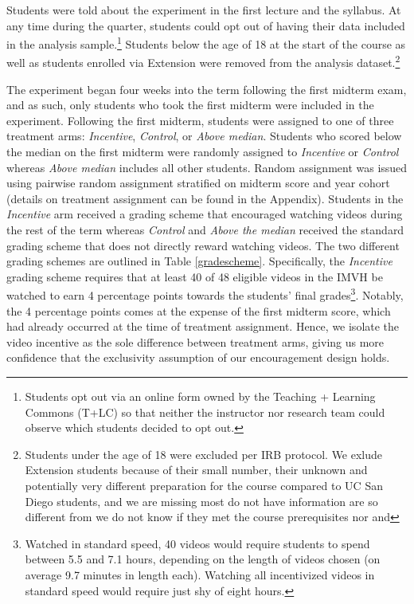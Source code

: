 \documentclass[12pt]{article}
\begin{document}
Students were told about the experiment in the first lecture and the syllabus. At any time during the quarter, students could opt out of having their data included in the analysis sample.\footnote{Students opt out via an online form owned by the Teaching + Learning Commons (T+LC) so that neither the instructor nor research team could observe which students decided to opt out.} Students below the age of 18 at the start of the course as well as students enrolled via Extension were removed from the analysis dataset.\footnote{Students under the age of 18 were excluded per IRB protocol. We exlude Extension students because of their small number, their unknown and potentially very different preparation for the course compared to UC San Diego students, and we are missing most do not have information are so different from we do not know if they met the course prerequisites nor and }

The experiment began four weeks into the term following the first midterm exam, and as such, only students who took the first midterm were included in the experiment. Following the first midterm, students were assigned to one of three treatment arms: \textit{Incentive}, \textit{Control}, or \textit{Above median}. Students who scored below the median on the first midterm were randomly assigned to \textit{Incentive} or \textit{Control} whereas \textit{Above median} includes all other students. Random assignment was issued using pairwise random assignment stratified on midterm score and year cohort (details on treatment assignment can be found in the Appendix). Students in the \textit{Incentive} arm received a grading scheme that encouraged watching videos during the rest of the term whereas \textit{Control} and \textit{Above the median} received the standard grading scheme that does not directly reward watching videos. The two different grading schemes are outlined in Table \ref{gradescheme}. Specifically, the \textit{Incentive} grading scheme requires that at least 40 of 48 eligible videos in the IMVH be watched to earn 4 percentage points towards the students' final grades\footnote{Watched in standard speed, 40 videos would require students to spend between 5.5 and 7.1 hours, depending on the length of videos chosen (on average 9.7 minutes in length each). Watching all incentivized videos in standard speed would require just shy of eight hours.}.
Notably, the 4 percentage points comes at the expense of the first midterm score, which had already occurred at the time of treatment assignment. Hence, we isolate the video incentive as the sole difference between treatment arms, giving us more confidence that the exclusivity assumption of our encouragement design holds. %
\end{document}

